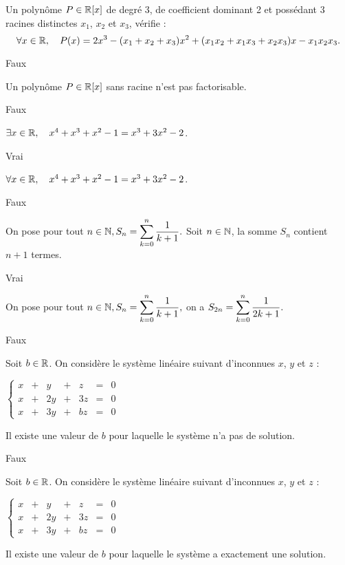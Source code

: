 \documentclass{article}
\begin{document}
\question Un polynôme $P \in \mathbb{R}[x]$ de degré 3, de coefficient dominant 2 et possédant 3 racines distinctes $x_1$, $x_2$ et $x_3$, vérifie : 
$$
\forall x \in \mathbb{R}, \quad P(x) = 2x^3 - ( x_1 + x_2 + x_3) x^2 + (x_1x_2 + x_1x_3 + x_2x_3) x - x_1 x_2 x_3 .
$$

\reponse Faux

\question Un polynôme $P \in \mathbb{R}[x]$ sans racine n'est pas factorisable.

\reponse Faux

\question $\exists x \in \mathbb{R}, \quad x^4 + x^3 + x^2 - 1 = x^3 + 3x^2 - 2$.

\reponse Vrai

\question $\forall x \in \mathbb{R}, \quad x^4 + x^3 + x^2 - 1 = x^3 + 3x^2 - 2$.

\reponse Faux

\question On pose pour tout $ n \in \mathbb{N}, S_n = \displaystyle\sum_{k=0}^n \dfrac{1}{k+1}.$ Soit $n \in \mathbb{N}$, la somme $S_n$ contient $n+1$ termes.

\reponse Vrai

\question On pose pour tout $ n \in \mathbb{N}, S_n = \displaystyle \sum_{k=0}^n \dfrac{1}{k+1},$ on a $S_{2n} = \displaystyle\sum_{k=0}^{n} \dfrac{1}{2k+1}.$

\reponse Faux

\question Soit $b \in \mathbb{R}$. On considère le système linéaire suivant d'inconnues $x$, $y$ et $z$ :

$ \left\lbrace \begin{array}{ccccccc}
x & + &  y & + &  z &  = & 0  \\
x & + & 2y & + & 3z &  = & 0  \\
x & + & 3y & + & bz &  = & 0  
\end{array} \right. $

Il existe une valeur de $b$ pour laquelle le système n'a pas de solution.

\reponse Faux

\question Soit $b \in \mathbb{R}$. On considère le système linéaire suivant d'inconnues $x$, $y$ et $z$ :

$ \left\lbrace \begin{array}{ccccccc}
x & + &  y & + &  z &  = & 0  \\
x & + & 2y & + & 3z &  = & 0  \\
x & + & 3y & + & bz &  = & 0  
\end{array} \right. $

Il existe une valeur de $b$ pour laquelle le système a exactement une solution.
\end{document}
